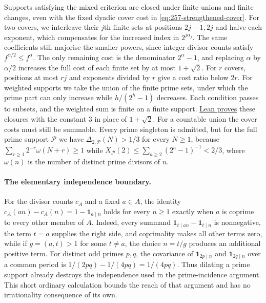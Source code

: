 \documentclass[11pt]{article}
\theoremstyle{plain}
\theoremstyle{definition}
\theoremstyle{remark}
\begin{document}
Supports satisfying the mixed criterion are closed under finite unions
and finite changes, even with the fixed dyadic cover cost in
\eqref{eq:257-strengthened-cover}. For two covers, we interleave their $j$th finite sets at positions
$2j-1,2j$ and halve each exponent, which compensates for the increased
index in $2^{j\alpha_j}$. The same coefficients still majorise the
smaller powers, since integer divisor counts satisfy
$f^{\alpha/2}\le f^\alpha$. The only remaining cost is the denominator
$2^\alpha-1$, and replacing $\alpha$ by $\alpha/2$ increases the full cost
of each finite set by at most $1+\sqrt2$.  For $r$ covers, positions at most $rj$ and
exponents divided by $r$ give a cost ratio below $2r$.  For weighted supports we take the union of the finite prime sets, under
which the prime part can only increase while $h/(2^h-1)$ decreases. Each
condition passes to subsets, and the weighted sum is finite on a finite
support.
\href{https://github.com/wcook04/plectis-erdos/blob/3973d3b10bce72017b8f60093f0d6c3f4f592d80/lean/ErdosProblems/Erdos257/PaperCompleteR8/StrengthenedCoverFiniteUnion.lean#L167}{Lean proves}
these closures with the constant $3$ in place of $1+\sqrt2$.
For a countable union the cover costs must still be summable. Every
prime singleton is admitted, but for the full prime support $\mathcal P$
we have $\Delta_{2,\mathcal P}(N)>1/3$ for every $N\ge1$, because
$\sum_{r\ge1}2^{-r}\omega(N+r)\ge1$ while
$X_{\mathcal P}(2)\le\sum_{a\ge2}(2^a-1)^{-1}<2/3$, where $\omega(n)$ is
the number of distinct prime divisors of $n$.

\paragraph{The elementary independence boundary.}
For the divisor counts $c_A$ and a fixed $a\in A$,
the identity $c_A(an)-c_A(n)=1-\mathbf1_{a\mid n}$ holds for every
$n\ge1$ exactly when $a$ is coprime to every other member of $A$.
Indeed, every summand $\mathbf1_{t\mid an}-\mathbf1_{t\mid n}$ is
nonnegative, the term $t=a$ supplies the right side, and coprimality
makes all other terms zero, while if $g=(a,t)>1$ for some $t\ne a$, the
choice $n=t/g$ produces an additional positive term.  For distinct odd primes $p,q$, the covariance of
$\mathbf1_{2p\mid n}$ and $\mathbf1_{2q\mid n}$ over a common period is
$1/(2pq)-1/(4pq)=1/(4pq)$.  Thus dilating a prime support already destroys
the independence used in the prime-incidence argument.  This short ordinary
calculation bounds the reach of that argument and has no irrationality
consequence of its own.
\end{document}
